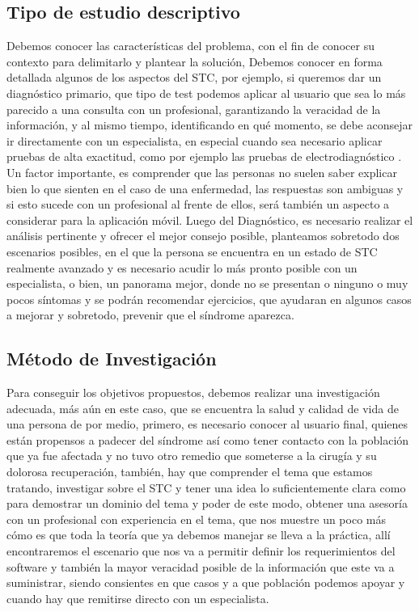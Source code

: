 \documentclass[a4paper,man,natbib]{apa6}
\begin{document}
\subsection{Tipo de estudio descriptivo}
Debemos conocer las características del problema, con el fin de conocer su contexto para delimitarlo y plantear la solución,  Debemos conocer en forma detallada algunos de los aspectos del STC, por ejemplo, si queremos dar un diagnóstico primario, que tipo de test podemos aplicar al usuario que sea lo más parecido a   una consulta con un profesional, garantizando la veracidad de la información, y al mismo tiempo, identificando en qué momento, se debe aconsejar ir directamente con un especialista, en especial cuando sea necesario aplicar  pruebas de alta exactitud, como por ejemplo las pruebas de electrodiagnóstico \cite{f8}. Un factor importante, es comprender que las personas no suelen saber explicar bien lo que sienten en el caso de una enfermedad, las respuestas son ambiguas y si esto sucede con un profesional al frente de ellos, será también un aspecto a considerar para la aplicación móvil. 
Luego del Diagnóstico, es necesario realizar el análisis pertinente y ofrecer el mejor consejo posible, planteamos sobretodo dos escenarios posibles, en el que la persona se encuentra en un estado de STC realmente avanzado y es necesario acudir lo más pronto posible con un especialista, o bien, un panorama mejor, donde no se presentan o ninguno o muy pocos síntomas y se podrán recomendar ejercicios, que ayudaran en algunos casos a mejorar y sobretodo, prevenir que el síndrome aparezca.

\subsection{Método de Investigación}
Para conseguir los objetivos propuestos, debemos realizar una investigación adecuada, más aún en este caso, que se encuentra la salud y calidad de vida de una persona de por medio, primero, es necesario conocer al usuario final, quienes están propensos a padecer del síndrome así como tener contacto con la población que ya fue afectada y no tuvo otro remedio que someterse a la cirugía y su dolorosa recuperación, también,   hay que comprender  el tema que estamos tratando, investigar sobre el STC y tener una idea lo suficientemente clara como para demostrar un dominio del tema y poder de este modo, obtener una asesoría con un profesional con experiencia en el tema, que nos muestre un poco más cómo es que toda la teoría que ya debemos manejar se lleva a la práctica, allí encontraremos el escenario que nos va a permitir definir los requerimientos del software  y también la mayor veracidad posible de la información que este va a suministrar, siendo consientes en que casos y a que población podemos apoyar  y cuando hay que remitirse directo con un especialista.
\end{document}
